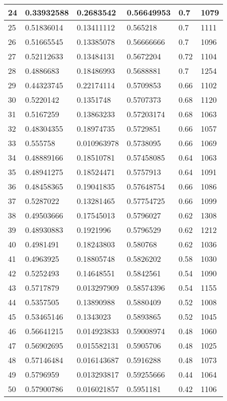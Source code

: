 \begin{longtable}{|l|l|l|l|l|l|}
24 & 0.33932588 & 0.2683542 & 0.56649953 & 0.7 & 1079 \\ \hline 
25 & 0.51836014 & 0.13411112 & 0.565218 & 0.7 & 1111 \\ \hline 
26 & 0.51665545 & 0.13385078 & 0.56666666 & 0.7 & 1096 \\ \hline 
27 & 0.52112633 & 0.13484131 & 0.5672204 & 0.72 & 1104 \\ \hline 
28 & 0.4886683 & 0.18486993 & 0.5688881 & 0.7 & 1254 \\ \hline 
29 & 0.44323745 & 0.22174114 & 0.5709853 & 0.66 & 1102 \\ \hline 
30 & 0.5220142 & 0.1351748 & 0.5707373 & 0.68 & 1120 \\ \hline 
31 & 0.5167259 & 0.13863233 & 0.57203174 & 0.68 & 1063 \\ \hline 
32 & 0.48304355 & 0.18974735 & 0.5729851 & 0.66 & 1057 \\ \hline 
33 & 0.555758 & 0.010963978 & 0.5738095 & 0.66 & 1069 \\ \hline 
34 & 0.48889166 & 0.18510781 & 0.57458085 & 0.64 & 1063 \\ \hline 
35 & 0.48941275 & 0.18524471 & 0.5757913 & 0.64 & 1091 \\ \hline 
36 & 0.48458365 & 0.19041835 & 0.57648754 & 0.66 & 1086 \\ \hline 
37 & 0.5287022 & 0.13281465 & 0.57754725 & 0.66 & 1099 \\ \hline 
38 & 0.49503666 & 0.17545013 & 0.5796027 & 0.62 & 1308 \\ \hline 
39 & 0.48930883 & 0.1921996 & 0.5796529 & 0.62 & 1212 \\ \hline 
40 & 0.4981491 & 0.18243803 & 0.580768 & 0.62 & 1036 \\ \hline 
41 & 0.4963925 & 0.18805748 & 0.5826202 & 0.58 & 1030 \\ \hline 
42 & 0.5252493 & 0.14648551 & 0.5842561 & 0.54 & 1090 \\ \hline 
43 & 0.5717879 & 0.013297909 & 0.58574396 & 0.54 & 1155 \\ \hline 
44 & 0.5357505 & 0.13890988 & 0.5880409 & 0.52 & 1008 \\ \hline 
45 & 0.53465146 & 0.1343023 & 0.5893865 & 0.52 & 1045 \\ \hline 
46 & 0.56641215 & 0.014923833 & 0.59008974 & 0.48 & 1060 \\ \hline 
47 & 0.56902695 & 0.015582131 & 0.5905706 & 0.48 & 1025 \\ \hline 
48 & 0.57146484 & 0.016143687 & 0.5916288 & 0.48 & 1073 \\ \hline 
49 & 0.5796959 & 0.013293817 & 0.59255666 & 0.44 & 1064 \\ \hline 
50 & 0.57900786 & 0.016021857 & 0.5951181 & 0.42 & 1106 \\ \hline 
\end{longtable}